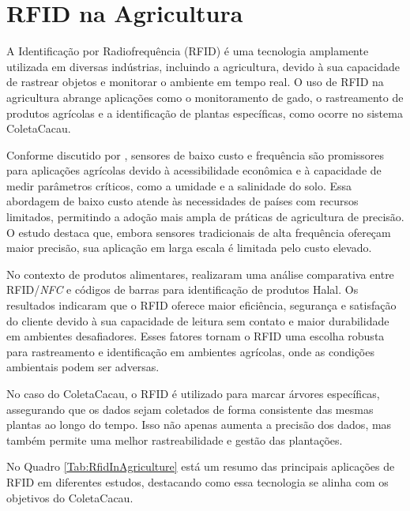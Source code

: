 \section{RFID na Agricultura}
A Identificação por Radiofrequência (RFID) é uma tecnologia amplamente utilizada em diversas indústrias, incluindo a agricultura, devido à sua capacidade de rastrear objetos e monitorar o ambiente em tempo real. O uso de RFID na agricultura abrange aplicações como o monitoramento de gado, o rastreamento de produtos agrícolas e a identificação de plantas específicas, como ocorre no sistema ColetaCacau.

Conforme discutido por \cite{Placidi2023LowCostAL}, sensores de baixo custo e frequência são promissores para aplicações agrícolas devido à acessibilidade econômica e à capacidade de medir parâmetros críticos, como a umidade e a salinidade do solo. Essa abordagem de baixo custo atende às necessidades de países com recursos limitados, permitindo a adoção mais ampla de práticas de agricultura de precisão. O estudo destaca que, embora sensores tradicionais de alta frequência ofereçam maior precisão, sua aplicação em larga escala é limitada pelo custo elevado.

No contexto de produtos alimentares, \cite{Khosravi2018ComparisonBN} realizaram uma análise comparativa entre RFID/\textit{NFC} e códigos de barras para identificação de produtos Halal. Os resultados indicaram que o RFID oferece maior eficiência, segurança e satisfação do cliente devido à sua capacidade de leitura sem contato e maior durabilidade em ambientes desafiadores. Esses fatores tornam o RFID uma escolha robusta para rastreamento e identificação em ambientes agrícolas, onde as condições ambientais podem ser adversas.

No caso do ColetaCacau, o RFID é utilizado para marcar árvores específicas, assegurando que os dados sejam coletados de forma consistente das mesmas plantas ao longo do tempo. Isso não apenas aumenta a precisão dos dados, mas também permite uma melhor rastreabilidade e gestão das plantações.

No Quadro \ref{Tab:RfidInAgriculture} está um resumo das principais aplicações de RFID em diferentes estudos, destacando como essa tecnologia se alinha com os objetivos do ColetaCacau.

